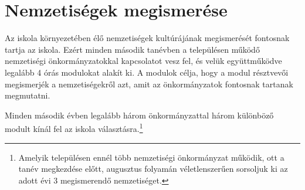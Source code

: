 \section{Nemzetiségek megismerése}
\label{sec:nemzetiseg}

Az iskola környezetében élő nemzetiségek kultúrájának
megismerését\linebreak
fontosnak tartja az iskola. Ezért minden második tanévben a településen működő nemzetiségi önkormányzatokkal kapcsolatot vesz fel, és  velük együttműködve legalább 4 órás modulokat alakít ki. A modulok célja, hogy a modul résztvevői megismerjék a nemzetiségekről azt, amit az önkormányzatok fontosnak tartanak megmutatni.

Minden második évben legalább három önkormányzattal három különböző modult kínál fel az iskola választásra.\footnote{Amelyik településen ennél több nemzetiségi önkormányzat működik, ott a tanév megkezdése előtt, augusztus folyamán véletlenszerűen sorsoljuk ki az adott évi 3 megismerendő nemzetiséget.}
